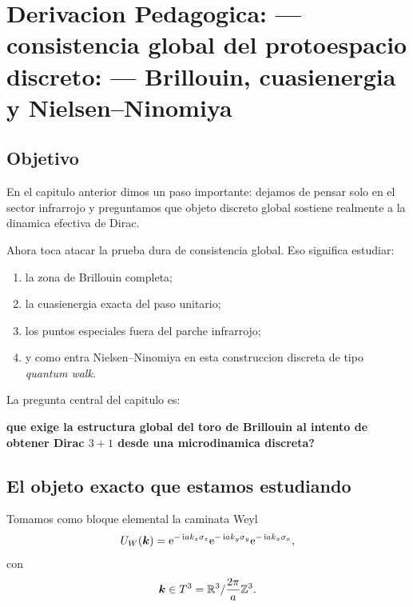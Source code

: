 \chapter{Derivacion Pedagogica: --- consistencia global del protoespacio discreto: --- Brillouin, cuasienergia y Nielsen--Ninomiya}
\label{ch:consistencia-global-brillouin}







\section{Objetivo}
En el capitulo anterior dimos un paso importante: dejamos de pensar solo en el sector infrarrojo y preguntamos que objeto discreto global sostiene realmente a la dinamica efectiva de Dirac.

Ahora toca atacar la prueba dura de consistencia global. Eso significa estudiar:
\begin{enumerate}[label=\arabic*.]
    \item la zona de Brillouin completa;
    \item la cuasienergia exacta del paso unitario;
    \item los puntos especiales fuera del parche infrarrojo;
    \item y como entra Nielsen--Ninomiya en esta construccion discreta de tipo \textit{quantum walk}.
\end{enumerate}

La pregunta central del capitulo es:
\begin{displayquote}
\textbf{que exige la estructura global del toro de Brillouin al intento de obtener Dirac \(3+1\) desde una microdinamica discreta?}
\end{displayquote}

\section{El objeto exacto que estamos estudiando}
Tomamos como bloque elemental la caminata Weyl
\begin{equation}
U_W(\bm{k})=
\mathrm{e}^{-\,\mathrm{i} a k_z \sigma_z}
\mathrm{e}^{-\,\mathrm{i} a k_y \sigma_y}
\mathrm{e}^{-\,\mathrm{i} a k_x \sigma_x},
\label{c32:eq:UW}
\end{equation}
con
\begin{equation}
\bm{k} \in T^3
=
\mathbb{R}^3/\frac{2\pi}{a}\mathbb{Z}^3.
\end{equation}

